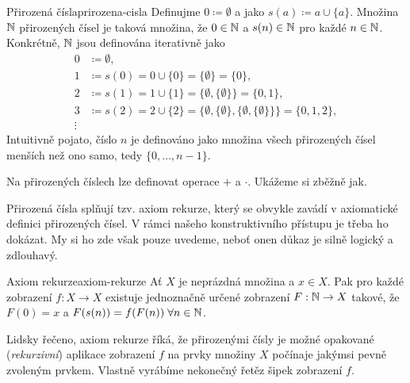\begin{definition}{Přirozená čísla}{prirozena-cisla}
 Definujme $0 \coloneqq \emptyset$ a  jako $s(a) \coloneqq
 a \cup \{a\}$. Množina $\mathbb{N}$ přirozených čísel je taková množina, že $0 \in \mathbb{N}$
 a $s(n) \in \mathbb{N}$ pro každé $n \in \mathbb{N}$. Konkrétně, $\mathbb{N}$ jsou definována
 iterativně jako
 \begin{align*}
  0 &\coloneqq \emptyset,\\
  1 & \coloneqq s(0) = 0 \cup \{0\} = \{\emptyset\} = \{0\},\\
  2 & \coloneqq s(1) = 1 \cup \{1\} = \{\emptyset,\{\emptyset\}\} = \{0,1\},\\
  3 & \coloneqq s(2) = 2 \cup \{2\} =
  \{\emptyset,\{\emptyset\},\{\emptyset,\{\emptyset\}\}\} = \{0,1,2\},\\
  \vdots
 \end{align*}
 Intuitivně pojato, číslo $n$ je definováno jako množina všech přirozených čísel
 menších než ono samo, tedy $\{0,\ldots,n-1\}$.
\end{definition}

Na přirozených číslech lze definovat operace $+$ a $ \cdot $. Ukážeme si zběžně
jak.

Přirozená čísla splňují tzv. axiom rekurze, který se obvykle zavádí v
axiomatické definici přirozených čísel. V rámci našeho konstruktivního přístupu
je třeba ho dokázat. My si ho zde však pouze uvedeme, neboť onen důkaz je silně
logický a zdlouhavý.

\begin{proposition}{Axiom rekurze}{axiom-rekurze}
 Ať $X$ je neprázdná množina a $x \in X$. Pak pro každé zobrazení $f:X \to X$
 existuje jednoznačně určené zobrazení $F:\mathbb{N} \to X$ takové, že $F(0) = x$ a
 $F(s(n)) = f(F(n)) \; \forall n \in \mathbb{N}$.
\end{proposition}

Lidsky řečeno, axiom rekurze říká, že přirozenými čísly je možné 
opakované (\emph{rekurzivní}) aplikace zobrazení $f$ na prvky množiny $X$
počínaje jakýmsi pevně zvoleným prvkem. Vlastně vyrábíme nekonečný řetěz šipek
zobrazení $f$.

